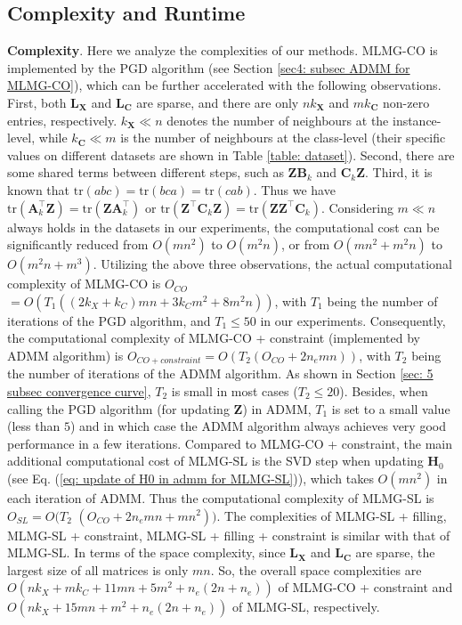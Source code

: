 \documentclass[twocolumn]{svjour3}          %
\newcommand{\A}{\mathbf{A}}
\newcommand{\C}{\mathbf{C}}
\newcommand{\X}{\mathbf{X}}
\newcommand{\Z}{\mathbf{Z}}
\newcommand{\HH}{\mathbf{H}}
\newcommand{\tr}{\mathrm{tr}}
\begin{document}
\subsection{Complexity and Runtime}
\label{sec: subsec complexity and runtime}

\noindent
{\bf Complexity}.
Here we analyze the complexities of our methods. 
MLMG-CO is implemented by the PGD algorithm (see Section \ref{sec4: subsec ADMM for MLMG-CO}), which can be further accelerated with the following observations.
First, both $\mathbf{L}_\X$ and $\mathbf{L}_\C$ are sparse, and there are only $n k_\X $ and $m k_\C$ non-zero entries, respectively. $k_\X \ll n$ denotes the number of neighbours at the instance-level, while $k_\C \ll m$ is the number of neighbours at the class-level (their specific values on different datasets are shown in Table \ref{table: dataset}).
%
Second, there are some shared terms between different steps, such as $\Z \mathbf{B}_k$ and $\C_k \Z$.
%
Third, it is known that $\tr(abc) = \tr(bca) = \tr(cab)$. Thus we have $\tr(\A_k^\top \Z) = \tr(\Z \A_k^\top)$ or $\tr(\Z^\top \C_k \Z) = \tr(\Z \Z^\top \C_k)$. Considering $m \ll n$ always holds in the datasets in our experiments, the computational cost can be significantly reduced from $O(mn^2)$ to $O(m^2n)$, or from $O(mn^2 + m^2n)$ to $O(m^2n + m^3)$.
Utilizing the above three observations, the actual computational complexity of MLMG-CO is $O_{CO}$ $ = O( T_1 ( (2k_X+ k_C)mn + 3k_C m^2 + 8 m^2 n ))$, with $T_1$ being the number of iterations of the PGD algorithm, and $T_1 \leq 50$ in our experiments.
%
Consequently, the computational complexity of MLMG-CO + constraint (implemented by ADMM algorithm) is 
 $O_{CO+constraint} = O(T_2 ( O_{CO} + 2 n_e m n) )$, with $T_2$ being the number of iterations of the ADMM algorithm. As shown in Section \ref{sec: 5 subsec convergence curve}, $T_2$ is small in most cases ($T_2\leq 20$). Besides, when calling the PGD algorithm (for updating $\Z$) in ADMM, $T_1$ is set to a small value (less than $5$) and in which case the ADMM algorithm always achieves very good performance in a few iterations. 
%
Compared to MLMG-CO + constraint, the main additional computational cost of MLMG-SL is the SVD step when updating $\HH_0$ (see Eq. (\ref{eq: update of H0 in admm for MLMG-SL})), which takes $O(m n^2)$ in each iteration of ADMM. Thus the computational complexity of MLMG-SL is $O_{SL} = O(T_2$ $( O_{CO} + 2 n_e m n + m n^2) )$. The complexities of MLMG-SL + filling, MLMG-SL + constraint, MLMG-SL + filling + constraint is similar with that of MLMG-SL.
%
In terms of the space complexity, since $\mathbf{L}_\X$ and $\mathbf{L}_\C$ are sparse, the largest size of all matrices is only $mn$. So, the overall space complexities are $O(nk_X + mk_C + 11mn + 5m^2 + n_e(2n + n_e))$ of MLMG-CO + constraint and $O(nk_X + 15mn + m^2 + n_e(2n + n_e))$ of MLMG-SL, respectively.
\end{document}
